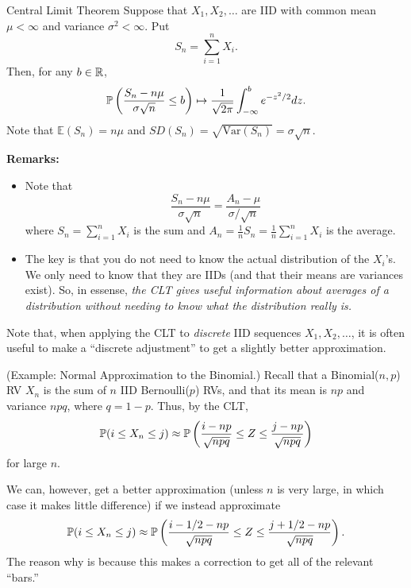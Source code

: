 \documentclass[letterpaper]{article}
\begin{document}
\begin{theorem}{Central Limit Theorem}{}
    Suppose that $X_1, X_2, \dots$ are IID with common mean $\mu < \infty$ and variance $\sigma^2 < \infty$. Put \[S_n = \sum_{i = 1}^{n} X_i.\] Then, for any $b \in \mathbb{R}$, 
    \[\mathbb{P}\left(\frac{S_n - n \mu}{\sigma\sqrt{n}} \leq b\right) \mapsto \frac{1}{\sqrt{2\pi}} \int_{-\infty}^{b} e^{-z^2 / 2}dz.\]
    Note that $\mathbb{E}(S_n) = n\mu$ and $SD(S_n) = \sqrt{\text{Var}(S_n)} = \sigma\sqrt{n}.$
\end{theorem}
\textbf{Remarks:} 
\begin{itemize}
    \item Note that 
    \[\frac{S_n - n\mu}{\sigma\sqrt{n}} = \frac{A_n - \mu}{\sigma / \sqrt{n}}\]
    where $S_n = \sum_{i = 1}^{n} X_i$ is the sum and $A_n = \frac{1}{n}S_n = \frac{1}{n} \sum_{i = 1}^{n} X_i$ is the average.  

    \item The key is that you do not need to know the actual distribution of the $X_i$'s. We only need to know that they are IIDs (and that their means are variances exist). So, in essense, \emph{the CLT gives useful information about averages of a distribution without needing to know what the distribution really is.}
\end{itemize}

Note that, when applying the CLT to \emph{discrete} IID sequences $X_1, X_2, \dots$, it is often useful to make a ``discrete adjustment'' to get a slightly better approximation. 

\begin{mdframed}[]
    (Example: Normal Approximation to the Binomial.) Recall that a Binomial($n, p$) RV $X_n$ is the sum of $n$ IID Bernoulli($p$) RVs, and that its mean is $np$ and variance $npq$, where $q = 1 - p$. Thus, by the CLT, 
    \[\mathbb{P}(i \leq X_n \leq j) \approx \mathbb{P}\left(\frac{i - np}{\sqrt{npq}} \leq Z \leq \frac{j - np}{\sqrt{npq}}\right)\]
    for large $n$.

    \bigskip 

    We can, however, get a better approximation (unless $n$ is very large, in which case it makes little difference) if we instead approximate
    \[\mathbb{P}(i \leq X_n \leq j) \approx \mathbb{P}\left(\frac{i - 1/2 - np}{\sqrt{npq}} \leq Z \leq \frac{j + 1/2 - np}{\sqrt{npq}}\right).\]
    The reason why is because this makes a correction to get all of the relevant ``bars.''
\end{mdframed}
\end{document}
